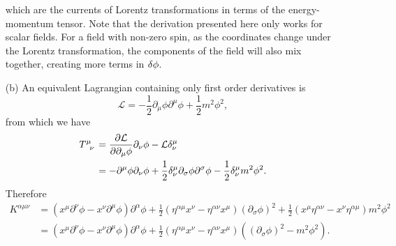 \documentclass[hyperref, a4paper]{article}
\begin{document}
\begin{itemize}
\begin{equation}
    \end{equation}
    which are the currents of Lorentz transformations in terms of the energy-momentum tensor.
    Note that the derivation presented here only works for scalar fields. For a field with non-zero spin, as the coordinates change under the Lorentz transformation, the components of the field will also mix together, creating more terms in $\var{\phi}$.
    \item[(b)] An equivalent Lagrangian containing only first order derivatives is 
    \begin{equation}
        \mathcal{L} = - \frac{1}{2} \partial_\mu \phi \partial^\mu \phi + \frac{1}{2} m^2 \phi^2,
    \end{equation} 
    from which we have 
    \[
        \begin{aligned}
            T\indices{^\mu_\nu} &= \pdv{\mathcal{L}}{\partial_\mu \phi} \partial_\nu \phi - \mathcal{L} \delta^{\mu}_\nu \\
            &= - \partial^\mu \phi \partial_\nu \phi + \frac{1}{2} \delta^\mu_\nu \partial_\sigma \phi \partial^\sigma \phi - \frac{1}{2} \delta^\mu_\nu m^2 \phi^2.    
        \end{aligned}
    \]
    Therefore 
    \begin{equation}
        \begin{aligned}
            K^{\alpha \mu \nu} &= (x^\mu \partial^\nu \phi - x^\nu \partial^\mu \phi) \partial^\alpha \phi + \frac{1}{2} (\eta^{\alpha \mu} x^\nu - \eta^{\alpha \nu} x^\mu) (\partial_\sigma \phi)^2 + \frac{1}{2} (x^\mu \eta^{\alpha \nu} - x^\nu \eta^{\alpha \mu}) m^2 \phi^2 \\
            &= (x^\mu \partial^\nu \phi - x^\nu \partial^\mu \phi) \partial^\alpha \phi + \frac{1}{2} (\eta^{\alpha \mu} x^\nu - \eta^{\alpha \nu} x^\mu) ((\partial_\sigma \phi)^2 - m^2 \phi^2).
        \end{aligned}
    \end{equation}
\end{itemize}
\end{document}
